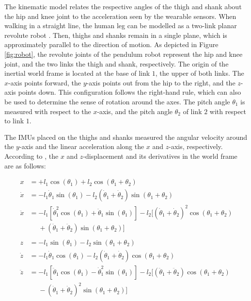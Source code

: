 The kinematic model relates the respective angles of the thigh and shank about the hip and knee joint to the acceleration seen by the wearable sensors. When walking in a straight line, the human leg can be modelled as a two-link planar revolute robot \cite{bennett_motion_2014}. Then, thighs and shanks remain in a single plane, which is approximately parallel to the direction of motion. As depicted in Figure \ref{fig:robot}, the revolute joints of the pendulum robot represent the hip and knee joint, and the two links the thigh and shank, respectively. The origin of the inertial world frame is located at the base of link $1$, the upper of both links. The $x$-axis points forward, the $y$-axis points out from the hip to the right, and the $z$-axis points down. This configuration follows the right-hand rule, which can also be used to determine the sense of rotation around the axes. The pitch angle $\theta_1$ is measured with respect to the $x$-axis, and the pitch angle $\theta_2$ of link $2$ with respect to link $1$.


The \glspl{IMU} placed on the thighs and shanks measured the angular velocity around the $y$-axis and the linear acceleration along the $x$ and $z$-axis, respectively. According to \citeauthor{spong2005robot} \cite{spong2005robot}, the $x$ and $z$-displacement and its derivatives in the world frame are as follows:

\begin{align}
  x &= + l_1 \cos(\theta_1) + l_2 \cos(\theta_1 + \theta_2) \\
  \dot{x} &= -l_1 \dot{\theta}_1 \sin(\theta_1) - l_2 (\dot{\theta}_1 + \dot{\theta}_2) \sin(\theta_1 + \theta_2) \\
  \ddot{x} &= -l_1 [\dot{\theta}^2_1 \cos(\theta_1) + \ddot{\theta}_1 \sin(\theta_1)] - l_2 [(\dot{\theta}_1 + \dot{\theta}_2)^2 \cos(\theta_1 + \theta_2) \nonumber \\ 
  &\mathrel{\phantom{=}} + (\ddot{\theta}_1 + \ddot{\theta}_2) \sin(\theta_1 + \theta_2)] \label{eq:acc_x} \\
  \nonumber \\
  z &= -l_1 \sin(\theta_1) - l_2 \sin(\theta_1 + \theta_2) \\
  \dot{z} &= -l_1 \dot{\theta}_1 \cos(\theta_1) - l_2 (\dot{\theta}_1 + \dot{\theta}_2) \cos(\theta_1 + \theta_2) \\
  \ddot{z} {}&= -l_1 [\ddot{\theta}_1 \cos(\theta_1) - \dot{\theta}^2_1 \sin(\theta_1)] - l_2 [(\ddot{\theta}_1 + \ddot{\theta}_2) \cos(\theta_1 + \theta_2) \nonumber \\ 
  &\mathrel{\phantom{=}} - (\dot{\theta}_1 + \dot{\theta}_2)^2 \sin(\theta_1 + \theta_2)] \label{eq:acc_y}
\end{align}

